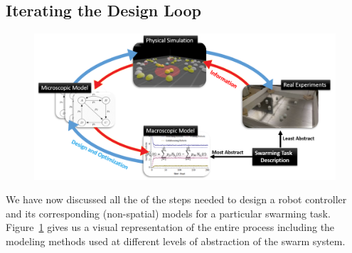 \documentclass[Main.tex]{subfiles}
\begin{document}

\subsection{Iterating the Design Loop}
\begin{figure}[!ht]
\centering\includegraphics[width=15cm]{assets/modelLoopNew.png}
\centering\caption{}\label{fig:recipe}
\end{figure}

We have now discussed all the of the steps needed to design a robot controller and its corresponding (non-spatial) models for a particular swarming task. Figure~\ref{fig:recipe} gives us a visual representation of the entire process including the modeling methods used at different levels of abstraction of the swarm system. 

\end{document}
